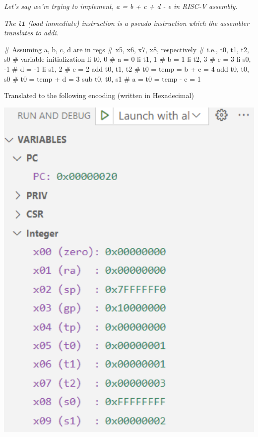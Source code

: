 \documentclass[12pt,openany]{book}
\begin{document}
\begin{justify}
	\textit{Let's say we're trying to implement, a = b + c + d - e in RISC-V assembly.} 
\end{justify}
\begin{minipage}[htp]{0.52\textwidth}

\begin{justify}
\textit{The \texttt{li} (load immediate) instruction is a pseudo instruction which the assembler translates to addi.}
	
\end{justify}\begin{assembly}
# Assuming a, b, c, d are in regs
# x5, x6, x7, x8, respectively
# i.e., t0, t1, t2, s0
# variable initialization
li t0, 0 # a = 0
li t1, 1 # b = 1
li t2, 3 # c = 3
li s0, -1 # d = -1
li s1, 2 # e = 2
add t0, t1, t2 # t0 = temp = b + c = 4
add t0, t0, s0 # t0 = temp + d = 3
sub t0, t0, s1 # a = t0 = temp - e = 1
\end{assembly}
\end{minipage}
\hfill
\vline
\hfill
\begin{minipage}[htp]{0.38\textwidth}
	Translated to the following encoding (written in Hexadecimal)
	\begin{center}
		\includegraphics[width=1\textwidth]{circuits/20.1.2_2.png}
	\end{center}
\end{minipage}
\end{document}
